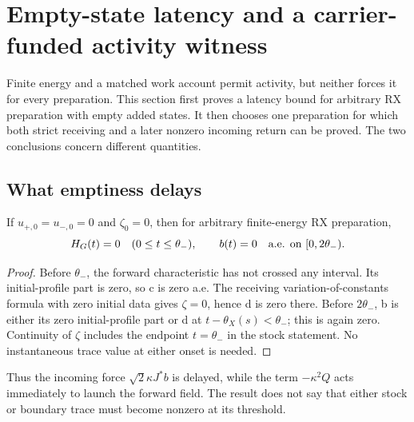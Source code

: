 \section{Empty-state latency and a carrier-funded activity witness}\label{sec:activity}
Finite energy and a matched work account permit activity, but neither forces it for every preparation. This section first proves a latency bound for arbitrary RX preparation with empty added states. It then chooses one preparation for which both strict receiving and a later nonzero incoming return can be proved. The two conclusions concern different quantities.

\subsection{What emptiness delays}
\begin{proposition}[Latency]\label{prop:latency}
If $u_{+,0}=u_{-,0}=0$ and $\zeta_0=0$, then for arbitrary finite-energy RX preparation,
\begin{equation}\label{eq:latency}
H_G(t)=0\quad(0\le t\le\theta_-),\qquad
b(t)=0\quad\textnormal{a.e. on }[0,2\theta_-).
\end{equation}
\end{proposition}
\begin{proof}
Before $\theta_-$, the forward characteristic has not crossed any interval. Its initial-profile part is zero, so c is zero a.e. The receiving variation-of-constants formula with zero initial data gives $\zeta=0$, hence d is zero there. Before $2\theta_-$, b is either its zero initial-profile part or d at $t-\theta_X(s)<\theta_-$; this is again zero. Continuity of $\zeta$ includes the endpoint $t=\theta_-$ in the stock statement. No instantaneous trace value at either onset is needed.
\end{proof}
Thus the incoming force $\sqrt2\kappa J^*b$ is delayed, while the term $-\kappa^2Q$ acts immediately to launch the forward field. The result does not say that either stock or boundary trace must become nonzero at its threshold.

